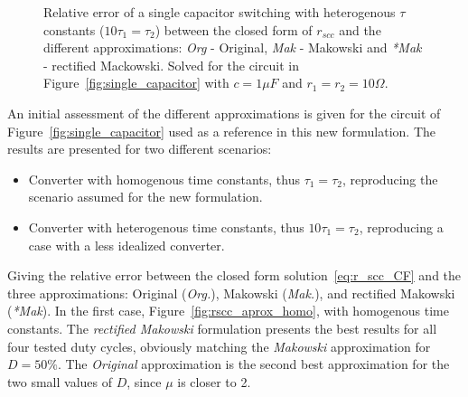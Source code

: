 \begin{figure}[!h]
\newcommand\pHeigh{3.25cm}
\newcommand\pWidth{4.5cm}
\centering
    \begin{subfigure}{\textwidth}
       \parbox[b]{.45\linewidth}{
            \raggedright
            \newcommand\dutyCycle{10}
            \newcommand\uDx{1.74}
            
        }
       \parbox[b]{.45\linewidth}{
            \raggedleft
            \newcommand\dutyCycle{23}
            \newcommand\uDx{2.12}
            
        }
    \end{subfigure}

    \begin{subfigure}{\textwidth}
       \parbox[b]{.45\linewidth}{
            \raggedright
            \newcommand\dutyCycle{36}
            \newcommand\uDx{2.43}
            
        }
       \parbox[b]{.45\linewidth}{
            \raggedleft
            \newcommand\dutyCycle{50}
            \newcommand\uDx{2.54}
            
        }
    \end{subfigure}



\caption[Different approximations methods for $r_{scc}$ scenario II]{Relative error of a single capacitor switching with heterogenous $\tau$ constants ($10 \tau_1 = \tau_2$)  between the closed form of $r_{scc}$ and the different approximations: \emph{Org} - Original, \emph{Mak} - Makowski and \emph{*Mak} - rectified Mackowski.  Solved for the circuit in Figure~\ref{fig:single_capacitor} with $c=1\mu F$ and $r_1=r_2=10\Omega$.}
\label{fig:rscc_aprox_hete}
\end{figure}

An initial assessment of the different approximations is given for the circuit of Figure~\ref{fig:single_capacitor} used as a reference in this new formulation. The results are presented for two different scenarios:
\begin{itemize}
  \item Converter with homogenous time constants, thus $\tau_1 = \tau_2$, reproducing the scenario assumed for the new formulation.

  \item Converter with heterogenous time constants, thus $10 \tau_1 = \tau_2$, reproducing a case with a less idealized converter.
\end{itemize}
Giving the relative error between the closed form solution~\eqref{eq:r_scc_CF} and the three approximations: Original (\emph{Org.}), Makowski (\emph{Mak.}), and rectified Makowski (\emph{*Mak}). In the first case, Figure~\ref{fig:rscc_aprox_homo}, with homogenous time constants. The \emph{rectified Makowski} formulation presents the best results for all four tested duty cycles, obviously matching the \emph{Makowski } approximation for $D=50\%$. The \emph{Original} approximation is the second best approximation for the two small values of $D$, since $\mu$ is closer to 2.

